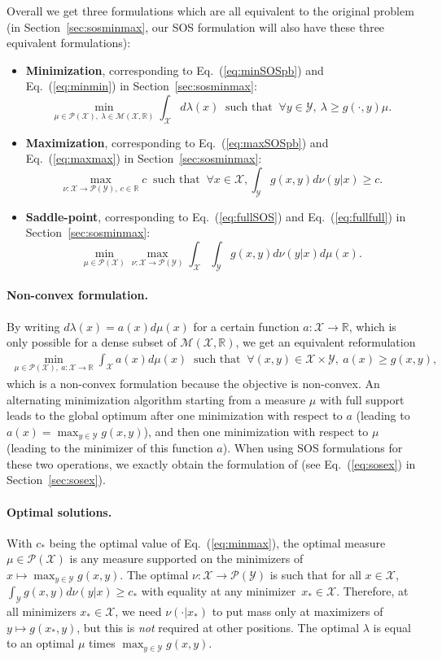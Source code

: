 \documentclass[11pt]{article}
\newcommand{\BEA}{\begin{eqnarray}}
\newcommand{\EEA}{\end{eqnarray}}
\newcommand{\BEQ}{\begin{equation}}
\newcommand{\EEQ}{\end{equation}}
\newcommand{\BIT}{\begin{itemize}}
\newcommand{\EIT}{\end{itemize}}
\newcommand{\rb}{\mathbb{R}}
\newcommand{\mysec}[1]{Section~\ref{sec:#1}}
\newcommand{\eq}[1]{Eq.~(\ref{eq:#1})}
\def \X{{\mathcal X}}
\def \Y{{\mathcal Y}}
\begin{document}
 
Overall we get three formulations which are all equivalent to the original problem (in \mysec{sosminmax}, our SOS formulation will also have these three equivalent formulations):
\BIT
\item \textbf{Minimization}, corresponding to \eq{minSOSpb} and \eq{minmin} in \mysec{sosminmax}:
\BEQ
\label{eq:min} \min_{ \mu \in \mathcal{P}(\X), \   \lambda \in  \mathcal{M}(\X,\rb)  } \int_\X  d\lambda(x) \ \mbox{ such that } \ \forall  y \in \Y, \  \lambda \geqslant g(\cdot,y) \mu.
 \EEQ
   
\item \textbf{Maximization}, corresponding to \eq{maxSOSpb} and \eq{maxmax} in \mysec{sosminmax}:
\BEQ
\label{eq:max}
\max_{ \nu: \X \to \mathcal{P}(\Y), \ c \in \rb} c\ \mbox{ such that } \ \forall x\in \X,   \int_\Y g(x,y) d\nu(y|x)  \geqslant c.
\EEQ
  
\item \textbf{Saddle-point}, corresponding to \eq{fullSOS} and \eq{fullfull} in \mysec{sosminmax}:
\BEQ
\label{eq:minmaxfull} \min_{ \mu \in \mathcal{P}(\X)} \max_{ \nu: \X \to \mathcal{P}(\Y)}
\int_\X \int_\Y g(x,y) d\nu(y|x)  d\mu(x).
\EEQ
\EIT

\paragraph{Non-convex formulation.}
By writing $d\lambda(x) = a(x) d\mu(x)$  for a certain function $a: \X \to \rb$, which is only possible for a dense subset of $  \mathcal{M}(\X,\rb)$, we get  an equivalent reformulation
\BEA
\label{eq:ncf}
\min_{ \mu \in \mathcal{P}(\X), \ a: \X \to \rb} \int_\X a(x) d\mu(x) \ \mbox{ such that } \ \forall (x,y) \in \X \times \Y, \ a(x) \geqslant g(x,y) ,\EEA
which is a non-convex formulation because the objective is non-convex. An alternating minimization algorithm starting from a measure $\mu$ with full support leads to the global optimum after one minimization with respect to $a$ (leading to $a(x) = \max_{y \in \Y} g(x,y)$), and then one minimization with respect to $\mu$ (leading to the minimizer of this function $a$).
When using SOS formulations for these two operations,  we exactly obtain the formulation of \cite{lasserre2011min} (see \eq{sosex}  in \mysec{sosex}).


 \paragraph{Optimal solutions.}
 With $c_\ast$ being the optimal value of \eq{minmax}, the optimal measure $\mu \in \mathcal{P}(\X)$ is any measure supported on the minimizers of $  x \mapsto \max_{y \in \Y} g(x,y)$.
 The optimal $\nu: \X \to \mathcal{P}(\Y)$ is such that for all $x \in \X$, $  \int_\Y g(x,y) d\nu(y|x)  \geqslant c_\ast$
 with equality at any minimizer~$x_\ast \in \X$. Therefore, at all minimizers $x_\ast \in \X$, we need $\nu(\cdot|x_\ast)$ to put mass only at maximizers of $y \mapsto g(x_\ast,y)$, but  this is \emph{not} required at other positions.
The optimal $\lambda$ is equal to an optimal $\mu$ times $\max_{y \in \Y} g(x,y)$.
\end{document}

